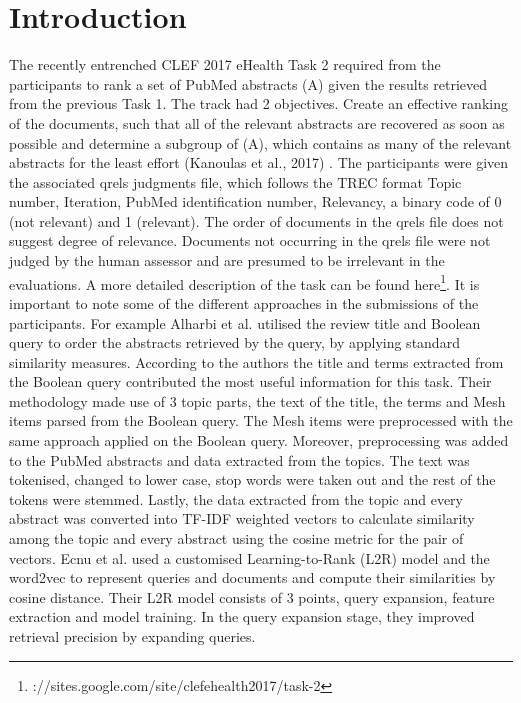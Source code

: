 \section{Introduction}

The recently entrenched CLEF 2017 eHealth Task 2 required from the participants to rank a set of PubMed abstracts (A) given the results retrieved from the previous Task 1. The track had 2 objectives. Create an effective ranking of the documents, such that all of the relevant abstracts are recovered as soon as possible and determine a subgroup of (A), which contains as many of the relevant abstracts for the least effort (Kanoulas et al., 2017) \cite{kanoulas2017clef}. The participants were given the associated qrels judgments file, which follows the TREC format Topic number, Iteration, PubMed identification number, Relevancy, a binary code of 0 (not relevant) and 1 (relevant). The order of documents in the qrels file does not suggest degree of relevance. Documents not occurring in the qrels file were not judged by the human assessor and are presumed to be irrelevant in the evaluations. A more detailed description of the task can be found here\footnote{://sites.google.com/site/clefehealth2017/task-2}.
It is important to note some of the different approaches in the submissions of the participants. For example Alharbi et al. \cite{alharbiranking} utilised the review title and Boolean query to order the abstracts retrieved by the query, by applying standard similarity measures. According to the authors \cite{alharbiranking} the title and terms extracted from the Boolean query contributed the most useful information for this task. Their methodology made use of 3 topic parts, the text of the title, the terms and Mesh items parsed from the Boolean query. The Mesh items were preprocessed with the same approach applied on the Boolean query. Moreover, preprocessing was added to the PubMed abstracts and data extracted from the topics. The text was tokenised, changed to lower case, stop words were taken out and the rest of the tokens were stemmed. Lastly, the data extracted from the topic and every abstract was converted into TF-IDF weighted vectors \cite{alharbiranking} to calculate similarity among the topic and every abstract using the cosine metric for the pair of vectors.
Ecnu et al. \cite{chen2017ecnu} used a customised Learning-to-Rank (L2R) model and the word2vec to represent queries and documents and compute their similarities by cosine distance. Their L2R model consists of 3 points, query expansion, feature extraction and model training. In the query expansion stage, they improved retrieval precision by expanding queries. 
